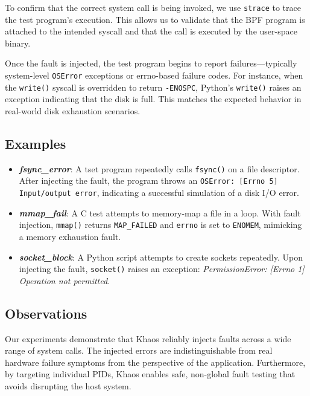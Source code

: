 To confirm that the correct system call is being invoked, we use \texttt{strace} to trace the test program’s execution. This allows us to validate that the BPF program is attached to the intended syscall and that the call is executed by the user-space binary.

Once the fault is injected, the test program begins to report failures—typically system-level \texttt{OSError} exceptions or errno-based failure codes. For instance, when the \texttt{write()} syscall is overridden to return \texttt{-ENOSPC}, Python’s \texttt{write()} raises an exception indicating that the disk is full. This matches the expected behavior in real-world disk exhaustion scenarios.

\subsection{Examples}

\begin{itemize}
    \item \textbf{\textit{fsync\_error}}: A tset program repeatedly calls \texttt{fsync()} on a file descriptor. After injecting the fault, the program throws an \texttt{OSError: [Errno 5] Input/output error}, indicating a successful simulation of a disk I/O error.
    
    \item \textbf{\textit{mmap\_fail}}: A C test attempts to memory-map a file in a loop. With fault injection, \texttt{mmap()} returns \texttt{MAP\_FAILED} and \texttt{errno} is set to \texttt{ENOMEM}, mimicking a memory exhaustion fault.
    
    \item \textbf{\textit{socket\_block}}: A Python script attempts to create sockets repeatedly. Upon injecting the fault, \texttt{socket()} raises an exception: \textit{PermissionError: [Errno 1] Operation not permitted}.
\end{itemize}

\subsection{Observations}

Our experiments demonstrate that Khaos reliably injects faults across a wide range of system calls. The injected errors are indistinguishable from real hardware failure symptoms from the perspective of the application. Furthermore, by targeting individual PIDs, Khaos enables safe, non-global fault testing that avoids disrupting the host system.


